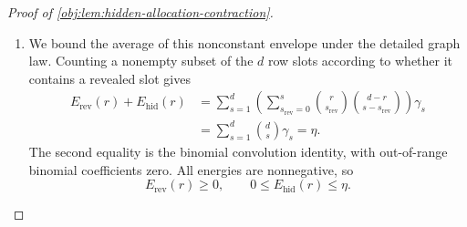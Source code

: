 \documentclass[11pt]{article}
\begin{document}
\begin{proof}[Proof of \cref{obj:lem:hidden-allocation-contraction}]
\begin{enumerate}
Since the \(R_\ell\) are disjoint, each global revealed subset \(J\) corresponds bijectively to its rowwise subsets \(J\cap R_\ell\).
For a row in \(\mathcal B_J\), summing over its nonempty revealed subsets gives
\[
\sum_{\substack{J_\ell\subseteq R_\ell\\J_\ell\ne\varnothing}}
\sum_{k_\ell=0}^{u_\ell}
\binom{u_\ell}{k_\ell}\gamma_{|J_\ell|+k_\ell}
=
E_{\mathrm{rev}}(r_\ell).
\]
For a hidden-active row, its factor is \(E_{\mathrm{hid}}(r_\ell)\).
It follows that
\[
\mathcal A_H
=
\sum_{\substack{
\mathcal B_{\mathrm{rev}},\mathcal B_{\mathrm{hid}}
\subseteq\{1,\ldots,B\}\\
\mathcal B_{\mathrm{rev}}\cap\mathcal B_{\mathrm{hid}}=\varnothing}}
\rho_{|\mathcal B_{\mathrm{rev}}|,|\mathcal B_{\mathrm{hid}}|}^{|\mathcal B_{\mathrm{hid}}|}
\prod_{\ell\in\mathcal B_{\mathrm{rev}}}E_{\mathrm{rev}}(r_\ell)
\prod_{\ell\in\mathcal B_{\mathrm{hid}}}E_{\mathrm{hid}}(r_\ell).
\]
The pair of empty row sets contributes exactly one. Removing it gives
\[
\begin{aligned}
\mathcal A_H-1
=
\sum_{\substack{
\mathcal B_{\mathrm{rev}}\cap\mathcal B_{\mathrm{hid}}=\varnothing\\
|\mathcal B_{\mathrm{rev}}|+|\mathcal B_{\mathrm{hid}}|>0}}
&\rho_{|\mathcal B_{\mathrm{rev}}|,|\mathcal B_{\mathrm{hid}}|}^{|\mathcal B_{\mathrm{hid}}|}
\\
&{}\times
\prod_{\ell\in\mathcal B_{\mathrm{rev}}}E_{\mathrm{rev}}(r_\ell)
\prod_{\ell\in\mathcal B_{\mathrm{hid}}}E_{\mathrm{hid}}(r_\ell).
\end{aligned}
\]
The row sets in this display are subsets of \(\{1,\ldots,B\}\).

\item We bound the average of this nonconstant envelope under the detailed graph law. Counting a nonempty subset of the \(d\) row slots according to whether it contains a revealed slot gives
\[
\begin{aligned}
E_{\mathrm{rev}}(r)+E_{\mathrm{hid}}(r)
&=
\sum_{s=1}^d
\left(
\sum_{s_{\mathrm{rev}}=0}^s
\binom r{s_{\mathrm{rev}}}
\binom{d-r}{s-s_{\mathrm{rev}}}
\right)\gamma_s
\\
&=
\sum_{s=1}^d\binom ds\gamma_s=\eta.
\end{aligned}
\]
The second equality is the binomial convolution identity, with out-of-range binomial coefficients zero. All energies are nonnegative, so
\[
E_{\mathrm{rev}}(r)\ge0,
\qquad
0\le E_{\mathrm{hid}}(r)\le\eta.
\]


\end{enumerate}
\end{proof}
\end{document}
